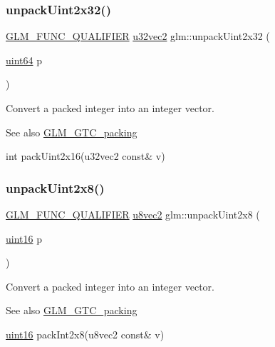 \subsubsection{\texorpdfstring{unpack\+Uint2x32()}{unpackUint2x32()}}
{\footnotesize\ttfamily \hyperlink{setup_8hpp_a33fdea6f91c5f834105f7415e2a64407}{G\+L\+M\+\_\+\+F\+U\+N\+C\+\_\+\+Q\+U\+A\+L\+I\+F\+I\+ER} \hyperlink{group__gtc__type__precision_gad854a1005ce84d8f6e8f05e42893f5c9}{u32vec2} glm\+::unpack\+Uint2x32 (\begin{DoxyParamCaption}\item[{\hyperlink{group__gtc__type__precision_gae3632bf9b37da66233d78930dd06378a}{uint64}}]{p }\end{DoxyParamCaption})}

Convert a packed integer into an integer vector.

\begin{DoxySeeAlso}{See also}
\hyperlink{group__gtc__packing}{G\+L\+M\+\_\+\+G\+T\+C\+\_\+packing} 

int pack\+Uint2x16(u32vec2 const\& v) 
\end{DoxySeeAlso}
\mbox{\label{group__gtc__packing_ga060e0e7e299aa73ff869c197ebf44210}} 
\subsubsection{\texorpdfstring{unpack\+Uint2x8()}{unpackUint2x8()}}
{\footnotesize\ttfamily \hyperlink{setup_8hpp_a33fdea6f91c5f834105f7415e2a64407}{G\+L\+M\+\_\+\+F\+U\+N\+C\+\_\+\+Q\+U\+A\+L\+I\+F\+I\+ER} \hyperlink{group__gtc__type__precision_ga01e28d0272428f94d22ea6111f0112be}{u8vec2} glm\+::unpack\+Uint2x8 (\begin{DoxyParamCaption}\item[{\hyperlink{group__gtc__type__precision_gad8c2939e1fdd8e5828b31d95c52255d5}{uint16}}]{p }\end{DoxyParamCaption})}

Convert a packed integer into an integer vector.

\begin{DoxySeeAlso}{See also}
\hyperlink{group__gtc__packing}{G\+L\+M\+\_\+\+G\+T\+C\+\_\+packing} 

\hyperlink{group__gtc__type__precision_gad8c2939e1fdd8e5828b31d95c52255d5}{uint16} pack\+Int2x8(u8vec2 const\& v) 
\end{DoxySeeAlso}
\mbox{\label{group__gtc__packing_gaf1eea82404af955004aae19a2dcb55f1}} 

